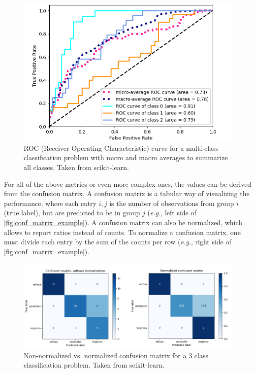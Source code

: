     \begin{figure}[ht]
      \centering
        \includegraphics[width=0.6\linewidth]{figs/aucroc.png}
      \caption[ROC (Receiver Operating Characteristic) curve for a multi-class classification problem with micro and macro averages to summarize all classes. Taken from scikit-learn.]{ROC (Receiver Operating Characteristic) curve for a multi-class classification problem with micro and macro averages to summarize all classes. Taken from scikit-learn\footnotemark .}
      \label{fig:auc_roc}
    \end{figure}
    
    For all of the above metrics or even more complex ones, the values can be derived from the confusion matrix. A confusion matrix is a tabular way of visualizing the performance, where each entry $i,j$ is the number of observations from group $i$ (true label), but are predicted to be in group $j$ (\textit{e.g.}, left side of \autoref{fig:conf_matrix_example}). A confusion matrix can also be normalized, which allows to report ratios instead of counts. To normalize a confusion matrix, one must divide each entry by the sum of the counts per row (\textit{e.g.}, right side of \autoref{fig:conf_matrix_example}).
    
    \begin{figure}[ht]
      \centering
        \includegraphics[width=\linewidth]{figs/conf_matrix_example.png}
      \caption{Non-normalized vs. normalized confusion matrix for a 3 class classification problem. Taken from scikit-learn.}
      \label{fig:conf_matrix_example}
    \end{figure}
    
